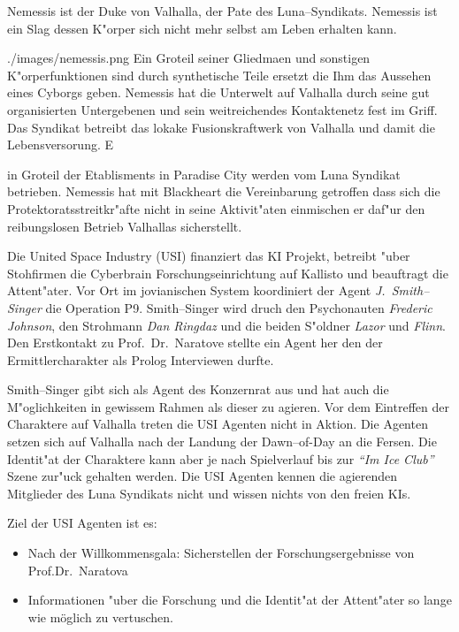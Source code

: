 
Nemessis ist der Duke von Valhalla, der Pate des Luna--Syndikats. Nemessis ist ein Slag dessen K"orper sich nicht mehr selbst am Leben erhalten kann. 

\begin{sideimagebox}[r]{0.7}{./images/nemessis.png}{}
    Ein Gro\3teil seiner Gliedma\3en und sonstigen K"orperfunktionen sind durch synthetische Teile ersetzt die Ihm das Aussehen eines Cyborgs geben. Nemessis hat die Unterwelt auf Valhalla durch seine gut organisierten Untergebenen und sein weitreichendes Kontaktenetz
    fest im Griff. Das Syndikat betreibt das lokake Fusionskraftwerk von Valhalla und damit die Lebensversorung. E
\end{sideimagebox}

in Gro\3teil der Etablisments in Paradise City werden vom Luna Syndikat betrieben. Nemessis hat mit Blackheart die Vereinbarung getroffen dass sich die Protektoratsstreitkr"afte nicht in seine Aktivit"aten einmischen er daf"ur den reibungslosen Betrieb Valhallas sicherstellt.


\newpage
{}

Die United Space Industry (USI) finanziert das KI Projekt, betreibt "uber Stohfirmen die Cyberbrain Forschungseinrichtung auf Kallisto und beauftragt die Attent"ater. Vor Ort im jovianischen System koordiniert der Agent \emph{J.~Smith--Singer} die Operation P9. Smith--Singer wird druch den Psychonauten \emph{Frederic Johnson}, den Strohmann \emph{Dan Ringdaz} und die beiden S"oldner \emph{Lazor} und \emph{Flinn}. Den Erstkontakt zu Prof.~Dr.~Naratove stellte ein Agent her den der Ermittlercharakter als Prolog Interviewen durfte.

Smith--Singer gibt sich als Agent des Konzernrat aus und hat auch die M"oglichkeiten in gewissem Rahmen als dieser zu agieren. Vor dem Eintreffen der Charaktere auf Valhalla treten die USI Agenten nicht in Aktion. Die Agenten setzen sich auf Valhalla nach der Landung der Dawn--of-Day an die Fersen. Die Identit"at der Charaktere kann aber je nach Spielverlauf bis zur \emph{"`Im Ice Club"'} Szene zur"uck gehalten werden. Die USI Agenten kennen die agierenden Mitglieder des Luna Syndikats nicht und wissen nichts von den freien KIs.

Ziel der USI Agenten ist es:

\begin{itemize}
    \item Nach der Willkommensgala: Sicherstellen der Forschungsergebnisse von Prof.Dr.~Naratova
    \item Informationen "uber die Forschung und die Identit"at der Attent"ater so lange wie möglich zu vertuschen.    
\end{itemize}

